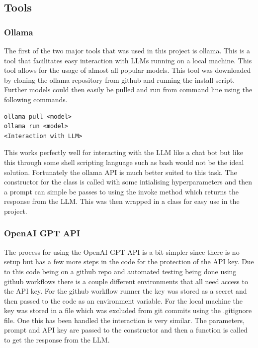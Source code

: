 \documentclass[12pt]{extarticle}
\begin{document}
\subsection{Tools}
\subsubsection{Ollama}

The first of the two major tools that was used in this project is ollama. This is a tool that facilitates easy interaction with LLMs running on a local machine. This tool allows for the usage of almost all popular models. This tool was downloaded by cloning the ollama repository from github and running the install script. Further models could then easily be pulled and run from command line using the following commands.

\begin{verbatim}
ollama pull <model>
ollama run <model>
<Interaction with LLM>
\end{verbatim}

This works perfectly well for interacting with the LLM like a chat bot but like this through some shell scripting language such as bash would not be the ideal solution. Fortunately the ollama API is much better suited to this task. The constructor for the class is called with some intialising hyperparameters and then a prompt can simple be passes to using the invoke method which returns the response from the LLM. This was then wrapped in a class for easy use in the project.

\subsubsection{OpenAI GPT API}

The process for using the OpenAI GPT API is a bit simpler since there is no setup but has a few more steps in the code for the protection of the API key. Due to this code being on a github repo and automated testing being done using github workflows there is a couple different environments that all need access to the API key. For the github workflow runner the key was stored as a secret and then passed to the code as an environment variable. For the local machine the key was stored in a file which was excluded from git commits using the .gitignore file. One this has been handled the interaction is very similar. The parameters, prompt and API key are passed to the constructor and then a function is called to get the response from the LLM.
\end{document}
